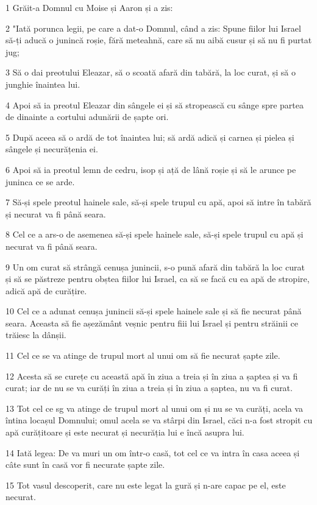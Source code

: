 \par 1 Grăit-a Domnul cu Moise și Aaron și a zis:
\par 2 "Iată porunca legii, pe care a dat-o Domnul, când a zis: Spune fiilor lui Israel să-ți aducă o junincă roșie, fără meteahnă, care să nu aibă cusur și să nu fi purtat jug;
\par 3 Să o dai preotului Eleazar, să o scoată afară din tabără, la loc curat, și să o junghie înaintea lui.
\par 4 Apoi să ia preotul Eleazar din sângele ei și să stropească cu sânge spre partea de dinainte a cortului adunării de șapte ori.
\par 5 După aceea să o ardă de tot înaintea lui; să ardă adică și carnea și pielea și sângele și necurățenia ei.
\par 6 Apoi să ia preotul lemn de cedru, isop și ață de lână roșie și să le arunce pe juninca ce se arde.
\par 7 Să-și spele preotul hainele sale, să-și spele trupul cu apă, apoi să intre în tabără și necurat va fi până seara.
\par 8 Cel ce a ars-o de asemenea să-și spele hainele sale, să-și spele trupul cu apă și necurat va fi până seara.
\par 9 Un om curat să strângă cenușa junincii, s-o pună afară din tabără la loc curat și să se păstreze pentru obștea fiilor lui Israel, ca să se facă cu ea apă de stropire, adică apă de curățire.
\par 10 Cel ce a adunat cenușa junincii să-și spele hainele sale și să fie necurat până seara. Aceasta să fie așezământ veșnic pentru fiii lui Israel și pentru străinii ce trăiesc la dânșii.
\par 11 Cel ce se va atinge de trupul mort al unui om să fie necurat șapte zile.
\par 12 Acesta să se curețe cu această apă în ziua a treia și în ziua a șaptea și va fi curat; iar de nu se va curăți în ziua a treia și în ziua a șaptea, nu va fi curat.
\par 13 Tot cel ce sg va atinge de trupul mort al unui om și nu se va curăți, acela va întina locașul Domnului; omul acela se va stârpi din Israel, căci n-a fost stropit cu apă curățitoare și este necurat și necurăția lui e încă asupra lui.
\par 14 Iată legea: De va muri un om într-o casă, tot cel ce va intra în casa aceea și câte sunt în casă vor fi necurate șapte zile.
\par 15 Tot vasul descoperit, care nu este legat la gură și n-are capac pe el, este necurat.
